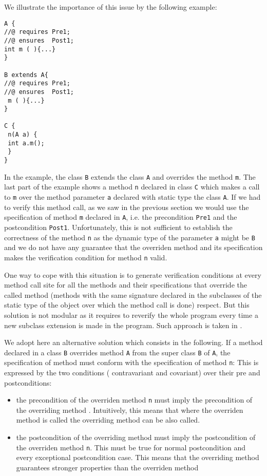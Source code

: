 We illustrate the importance of this issue by the following example: 
\begin{lstlisting}[frame=trbl]
A {
//@ requires Pre1;
//@ ensures  Post1;
int m ( ){...}
}

B extends A{  
//@ requires Pre1;
//@ ensures  Post1;
 m ( ){...}
}

C {
 n(A a) {
 int a.m();
 }
}
\end{lstlisting}

 In the example,  the class \lstinline!B! extends the class  
 \lstinline!A!   and overrides the method \lstinline!m!. The last part of the
 example shows a method \lstinline!n! declared in class 
 \lstinline!C! which makes a call to  \lstinline!m! over the method parameter
  \lstinline!a!  declared with static type the class \lstinline!A!.  If we had
 to verify this method call, as we saw in the previous section we would use
 the specification of method \lstinline!m! declared in \lstinline!A!, i.e. the
 precondition \lstinline!Pre1! and the postcondition  \lstinline!Post1!.
 Unfortunately, this is not sufficient to establish the correctness of the
 method \lstinline!n! as the dynamic type of the parameter  \lstinline!a!
 might be  \lstinline!B! and we do not have any guarantee that the overriden
 method and its specification makes the verification condition for method
 \lstinline!n! valid. 

 One way to cope with this situation is  to generate verification conditions
 at every method call site
 for all the methods and their specifications that  override the called method (methods with the
 same signature declared in the subclasses of the static type of the object over
 which the method call is done) respect. But this solution is not modular as
 it requires to reverify the whole program every time a new subclass extension
 is made in the program. Such approach is taken in \cite{AP98LFT}.

 We adopt here an alternative solution which  consists in the following.
If a method \methodd{} declared in a class \lstinline!B! overrides 
 method   \lstinline!A! from the super
 class \texttt{B} of \texttt{A}, the specification of method \methodd{} must conform with the specification of method   \mbox{\rm\texttt{n}}:
  This is expressed by the two  conditions ( contravariant and covariant) over their pre and postconditions:
        \begin{itemize}
           \item the precondition of the  overriden method \mbox{\rm\texttt{n}} must  imply
                 the precondition of the overriding method
                 \methodd{}. Intuitively, this means that where the overriden
                 method is called the overriding method can be also called.
           \item the postcondition of the overriding method  \methodd{}  must imply 
                 the postcondition of the overriden method \mbox{\rm\texttt{n}}. This  must be true for normal postcondition and
                 every  exceptional postcondition case. This
                 means that the overriding method guarantees stronger
                 properties than the overriden method 
        \end{itemize}


